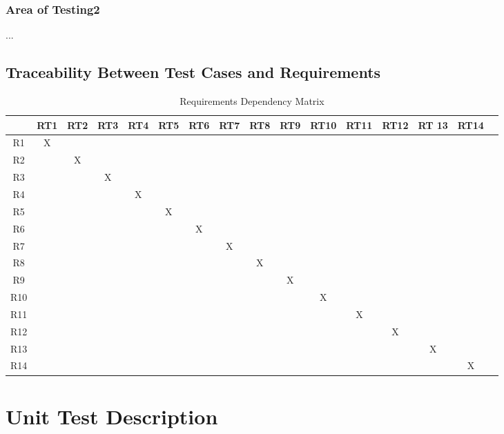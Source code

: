 \documentclass[12pt, titlepage]{article}
\begin{document}
\subsubsection{Area of Testing2}

...

\subsection{Traceability Between Test Cases and Requirements}
\begin{table}[H]
  \centering
  \caption{Requirements Dependency Matrix}
  \begin{tabular}{|c|c|c|c|c|c|c|c|c|c|c|c|c|c|c|c|}
  \hline
    & RT1 & RT2 & RT3 & RT4 & RT5 & RT6 & RT7 & RT8 & RT9 & RT10 & RT11 & RT12 & RT 13 & RT14\\
  \hline
  R1      &X & & & & & & & & & & & & & \\ 
  \hline
  R2      & &X & & & & & & & & & & & & \\ 
  \hline
  R3      & & &X & & & & & & & & & & & \\ 
  \hline
  R4      & & & &X & & & & & & & & & & \\ 
  \hline
  R5      & & & & &X & & & & & & & & & \\ 
  \hline
  R6      & & & & & &X & & & & & & & & \\ 
  \hline
  R7      & & & & & & &X & & & & & & & \\ 
  \hline
  R8      & & & & & & & &X & & & & & & \\ 
  \hline
  R9      & & & & & & & & &X & & & & & \\ 
  \hline
  R10      & & & & & & & & & &X & & & & \\ 
  \hline
  R11      & & & & & & & & & & &X & & & \\ 
  \hline
  R12      & & & & & & & & & & & &X & & \\ 
  \hline
  R13      & & & & & & & & & & & & &X & \\ 
  \hline
  R14      & & & & & & & & & & & & & &X \\ 
  \hline
  \end{tabular}
  
  \label{Table:A_trace}
  \end{table}


\section{Unit Test Description} \label{UnitTests}
\end{document}
